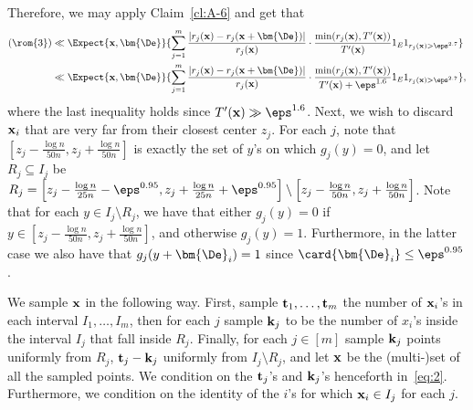 Therefore, we may apply Claim~\ref{cl:A-6} and get that
\begin{align}
(\rom{3})&\ll \Expect{{\bf x},\bm{\De}}{\sum\limits_{j=1}^{m} \frac{|r_j({\bf x}) - r_j({\bf x}+\bm{\De})|}{r_j({\bf x})} \cdot \frac{\min(r_j({\bf x}), T'({\bf x}))}{T'({\bf x})}
1_E 1_{r_j({\bf x}) >\eps^{2.7}}} \notag\\\label{eq:2}
&\ll \Expect{{\bf x},\bm{\De}}{\sum\limits_{j=1}^{m} \frac{|r_j({\bf x}) - r_j({\bf x}+\bm{\De})|}{r_j({\bf x})} \cdot \frac{\min(r_j({\bf x}), T'({\bf x}))}{T'({\bf x})+\eps^{1.6}}1_E 1_{r_j({\bf x}) >\eps^{2.7}}},
\end{align}
where the last inequality holds since $T'({\bf x})\gg \eps^{1.6}$. Next, we wish to discard ${\bf x}_i$ that are very far from their closest center $z_j$.
For each $j$, note that $\left[z_j-\frac{\log n}{50 n},z_j+\frac{\log n}{50 n}\right]$ is exactly the set of $y$'s on which
$g_j(y) = 0$, and let $R_j\subseteq I_j$ be $R_j = \left[z_j-\frac{\log n}{25 n}-\eps^{0.95},z_j+\frac{\log n}{25n}+\eps^{0.95}\right] \setminus
\left[z_j-\frac{\log n}{50 n},z_j+\frac{\log n}{50 n}\right]$.
Note that for each $y\in I_j\setminus R_j$, we have that either $g_j(y) = 0$ if $y\in \left[z_j-\frac{\log n}{50 n},z_j+\frac{\log n}{50 n}\right]$, and otherwise $g_j(y) = 1$.
Furthermore, in the latter case we also have that $g_j(y+\bm{\De}_i) = 1$ since $\card{\bm{\De}_i}\leq \eps^{0.95}$.

We sample ${\bf x}$ in the following way. First, sample ${\bf t}_1,\ldots,{\bf t}_m$ the number of ${\bf x}_i$'s in each interval $I_1,\ldots,I_m$,
then for each $j$ sample ${\bf k}_j$ to be the number of $x_i$'s inside the interval $I_j$ that fall inside $R_j$.
Finally, for each $j\in[m]$ sample ${\bf k}_j$ points uniformly from $R_j$, ${\bf t}_j - {\bf k}_j$ uniformly from $I_j\setminus R_j$, and let ${\bf x}$
be the (multi-)set of all the sampled points. We condition on the ${\bf t}_j$'s and ${\bf k}_j$'s henceforth in~\eqref{eq:2}. Furthermore, we condition
on the identity of the $i$'s for which ${\bf x}_i\in I_j$ for each $j$.


